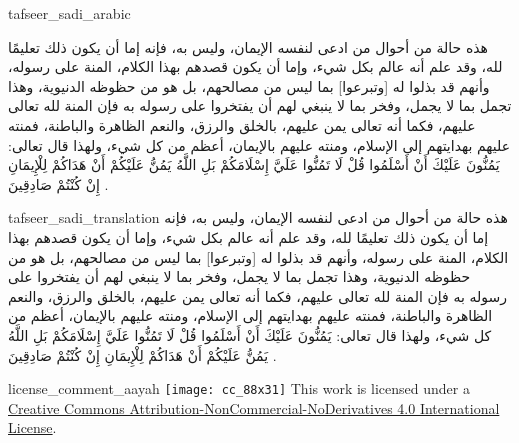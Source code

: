 \begin{taggedblock}{tafseer_sadi_arabic}
\begin{Arabic}
هذه حالة من أحوال من ادعى لنفسه الإيمان، وليس به، فإنه إما أن يكون ذلك تعليمًا لله، وقد علم أنه عالم بكل شيء، وإما أن يكون قصدهم بهذا الكلام، المنة على رسوله، وأنهم قد بذلوا له
[وتبرعوا]
بما ليس من مصالحهم، بل هو من حظوظه الدنيوية، وهذا تجمل بما لا يجمل، وفخر بما لا ينبغي لهم أن يفتخروا على رسوله به  فإن المنة لله تعالى عليهم، فكما أنه تعالى يمن  عليهم، بالخلق والرزق، والنعم الظاهرة والباطنة، فمنته عليهم بهدايتهم إلى الإسلام، ومنته عليهم بالإيمان، أعظم  من كل شيء، ولهذا قال تعالى:
{ يَمُنُّونَ عَلَيْكَ أَنْ أَسْلَمُوا قُلْ لَا تَمُنُّوا عَلَيَّ إِسْلَامَكُمْ بَلِ اللَّهُ يَمُنُّ عَلَيْكُمْ أَنْ هَدَاكُمْ لِلْإِيمَانِ إِنْ كُنْتُمْ صَادِقِينَ }
.
\end{Arabic}
\end{taggedblock}
\begin{taggedblock}{tafseer_sadi_translation}
هذه حالة من أحوال من ادعى لنفسه الإيمان، وليس به، فإنه إما أن يكون ذلك تعليمًا لله، وقد علم أنه عالم بكل شيء، وإما أن يكون قصدهم بهذا الكلام، المنة على رسوله، وأنهم قد بذلوا له
[وتبرعوا]
بما ليس من مصالحهم، بل هو من حظوظه الدنيوية، وهذا تجمل بما لا يجمل، وفخر بما لا ينبغي لهم أن يفتخروا على رسوله به  فإن المنة لله تعالى عليهم، فكما أنه تعالى يمن  عليهم، بالخلق والرزق، والنعم الظاهرة والباطنة، فمنته عليهم بهدايتهم إلى الإسلام، ومنته عليهم بالإيمان، أعظم  من كل شيء، ولهذا قال تعالى:
{ يَمُنُّونَ عَلَيْكَ أَنْ أَسْلَمُوا قُلْ لَا تَمُنُّوا عَلَيَّ إِسْلَامَكُمْ بَلِ اللَّهُ يَمُنُّ عَلَيْكُمْ أَنْ هَدَاكُمْ لِلْإِيمَانِ إِنْ كُنْتُمْ صَادِقِينَ }
.
\end{taggedblock}
\begin{taggedblock}{license_comment_aayah}
\texttt{[image: cc\_88x31]}
This work is licensed under a 
\href{http://creativecommons.org/licenses/by-nc-nd/4.0/}{Creative Commons Attribution-NonCommercial-NoDerivatives 4.0 International License}.
\end{taggedblock}
\begin{comment}
Please use the following for footnotes:- Sample\footnoteQ{Text of Qur'an footnote goes here.}.
Sample\footnoteT{Text of Tafseer footnote goes here.}.
\end{comment}